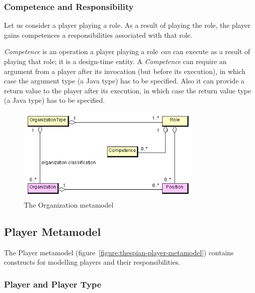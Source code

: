 \subsubsection*{Competence and Responsibility}

Let us consider a player playing a role.
As a result of playing the role, the player gains competences a responsibilities associated with that role.

\textit{Competence} is an operation a player playing a role \textit{can} can execute as a result of playing that role; it is a design-time entity.
A \textit{Competence} can require an argument from a player after its invocation (but before its execution), in which case the argument type (a Java type) has to be specified.
Also it can provide a return value to the player after its execution, in which case the return value type (a Java type) has to be specified.

\begin{figure}[ht]
	\centering
	\includegraphics[width=0.8\textwidth]{images/thespian/organization-metamodel.png}
	\caption{The Organization metamodel}
	\label{figure:thespian-organization-metamodel}
\end{figure}

\subsection{Player Metamodel}

The Player metamodel (figure~\ref{figure:thespian-player-metamodel}) contains constructs for modelling players and their responsibilities.

\subsubsection*{Player and Player Type}

